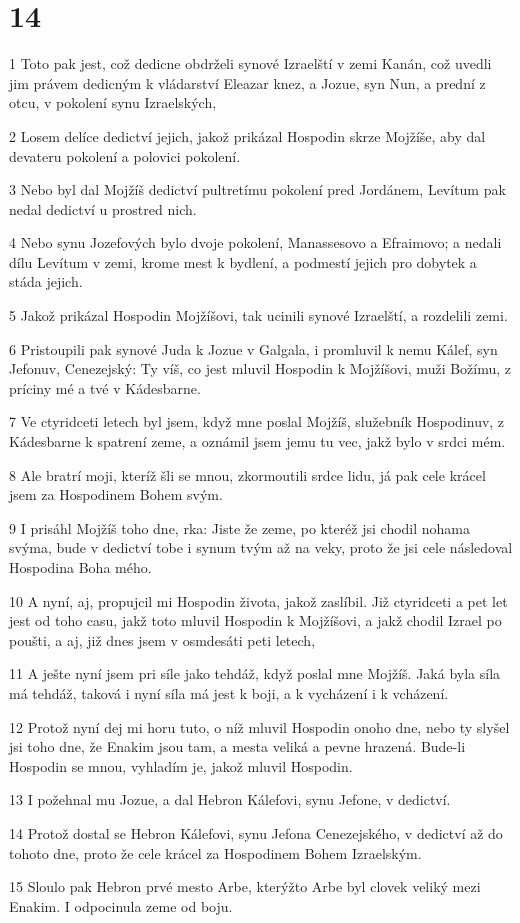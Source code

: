 \chapter{14}

\par 1 Toto pak jest, což dedicne obdrželi synové Izraelští v zemi Kanán, což uvedli jim právem dedicným k vládarství Eleazar knez, a Jozue, syn Nun, a prední z otcu, v pokolení synu Izraelských,
\par 2 Losem delíce dedictví jejich, jakož prikázal Hospodin skrze Mojžíše, aby dal devateru pokolení a polovici pokolení.
\par 3 Nebo byl dal Mojžíš dedictví pultretímu pokolení pred Jordánem, Levítum pak nedal dedictví u prostred nich.
\par 4 Nebo synu Jozefových bylo dvoje pokolení, Manassesovo a Efraimovo; a nedali dílu Levítum v zemi, krome mest k bydlení, a podmestí jejich pro dobytek a stáda jejich.
\par 5 Jakož prikázal Hospodin Mojžíšovi, tak ucinili synové Izraelští, a rozdelili zemi.
\par 6 Pristoupili pak synové Juda k Jozue v Galgala, i promluvil k nemu Kálef, syn Jefonuv, Cenezejský: Ty víš, co jest mluvil Hospodin k Mojžíšovi, muži Božímu, z príciny mé a tvé v Kádesbarne.
\par 7 Ve ctyridceti letech byl jsem, když mne poslal Mojžíš, služebník Hospodinuv, z Kádesbarne k spatrení zeme, a oznámil jsem jemu tu vec, jakž bylo v srdci mém.
\par 8 Ale bratrí moji, kteríž šli se mnou, zkormoutili srdce lidu, já pak cele krácel jsem za Hospodinem Bohem svým.
\par 9 I prisáhl Mojžíš toho dne, rka: Jiste že zeme, po kteréž jsi chodil nohama svýma, bude v dedictví tobe i synum tvým až na veky, proto že jsi cele následoval Hospodina Boha mého.
\par 10 A nyní, aj, propujcil mi Hospodin života, jakož zaslíbil. Již ctyridceti a pet let jest od toho casu, jakž toto mluvil Hospodin k Mojžíšovi, a jakž chodil Izrael po poušti, a aj, již dnes jsem v osmdesáti peti letech,
\par 11 A ješte nyní jsem pri síle jako tehdáž, když poslal mne Mojžíš. Jaká byla síla má tehdáž, taková i nyní síla má jest k boji, a k vycházení i k vcházení.
\par 12 Protož nyní dej mi horu tuto, o níž mluvil Hospodin onoho dne, nebo ty slyšel jsi toho dne, že Enakim jsou tam, a mesta veliká a pevne hrazená. Bude-li Hospodin se mnou, vyhladím je, jakož mluvil Hospodin.
\par 13 I požehnal mu Jozue, a dal Hebron Kálefovi, synu Jefone, v dedictví.
\par 14 Protož dostal se Hebron Kálefovi, synu Jefona Cenezejského, v dedictví až do tohoto dne, proto že cele krácel za Hospodinem Bohem Izraelským.
\par 15 Sloulo pak Hebron prvé mesto Arbe, kterýžto Arbe byl clovek veliký mezi Enakim. I odpocinula zeme od boju.

